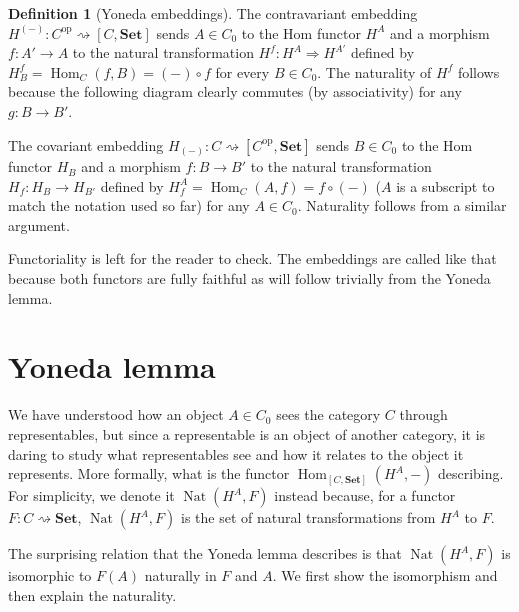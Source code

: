 \documentclass{article}
\theoremstyle{definition}
\newtheorem{defn}[thm]{Definition}
\theoremstyle{remark}
\DeclareMathOperator{\Hom}{Hom}
\DeclareMathOperator{\Nat}{Nat}
\newcommand{\op}[1]{#1^{\text{op}}}
\begin{document}
\begin{defn}[Yoneda embeddings]
	The contravariant embedding $H^{(-)}: \op{C} \rightsquigarrow [C, \textbf{Set}]$ sends $A \in C_0$ to the Hom functor $H^A$ and a morphism $f: A'\rightarrow A$ to the natural transformation $H^f: H^{A} \Rightarrow H^{A'}$ defined by $H^f_B = \Hom_C(f,B) = (-) \circ f$ for every $B \in C_0$. The naturality of $H^f$ follows because the following diagram clearly commutes (by associativity) for any $g: B\rightarrow B'$.
	\begin{figure}[h]
		\centering
	\end{figure}
	
	The covariant embedding $H_{(-)}:C \rightsquigarrow [\op{C}, \textbf{Set}]$ sends $B \in C_0$ to the Hom functor $H_B$ and a morphism $f:B\rightarrow B'$ to the natural transformation $H_f:H_B \rightarrow H_{B'}$ defined by $H_f^A = \Hom_C(A,f) = f\circ (-)$ ($A$ is a subscript to match the notation used so far) for any $A \in C_0$. Naturality follows from a similar argument.
\end{defn}
Functoriality is left for the reader to check. The embeddings are called like that because both functors are fully faithful as will follow trivially from the Yoneda lemma.


\section{Yoneda lemma}
We have understood how an object $A \in C_0$ sees the category $C$ through representables, but since a representable is an object of another category, it is daring to study what representables see and how it relates to the object it represents. More formally, what is the functor $\Hom_{[C, \textbf{Set}]}(H^A, -)$ describing. For simplicity, we denote it $\Nat(H^A, F)$ instead because, for a functor $F:C \rightsquigarrow \textbf{Set}$, $\Nat(H^A,F)$ is the set of natural transformations from $H^A$ to $F$.

The surprising relation that the Yoneda lemma describes is that $\Nat(H^A,F)$ is isomorphic to $F(A)$ naturally in $F$ and $A$. We first show the isomorphism and then explain the naturality.
\end{document}

